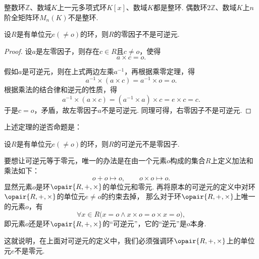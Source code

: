 \begin{example}
整数环\(\mathbb{Z}\)、数域\(K\)上一元多项式环\(K[x]\)、数域\(K\)都是整环.
偶数环\(2\mathbb{Z}\)、数域\(K\)上\(n\)阶全矩阵环\(M_n(K)\)不是整环.
\end{example}

\begin{theorem}
设\(R\)是有单位元\(e(\neq o)\)的环，则\(R\)的零因子不是可逆元.
\begin{proof}
设\(a\)是左零因子，则存在\(c \in R\)且\(c \neq o\)，使得\[
    a \times c = o.
\]

假如\(a\)是可逆元，则在上式两边左乘\(a^{-1}\)，再根据乘零定理，得\[
    a^{-1} \times (a \times c) = a^{-1} \times o = o.
\]
根据乘法的结合律和逆元的性质，得\[
    a^{-1} \times (a \times c) = (a^{-1} \times a) \times c = e \times c = c.
\]
于是\(c = o\)，矛盾，故左零因子\(a\)不是可逆元.
同理可得，右零因子不是可逆元.
\end{proof}
\end{theorem}

上述定理的逆否命题是：
\begin{corollary}
设\(R\)是有单位元\(e(\neq o)\)的环，则\(R\)的可逆元不是零因子.
\end{corollary}

\begin{example}
要想让可逆元等于零元，唯一的办法是在由一个元素\(o\)构成的集合\(R\)上定义加法和乘法如下：\[
    o + o \mapsto o,
    \qquad
    o \times o \mapsto o.
\]
显然元素\(o\)是环\(\opair{R,+,\times}\)的单位元和零元.
再将原本的可逆元的定义中对环\(\opair{R,+,\times}\)的单位元\(e \neq o\)的约束去掉，
那么对于环\(\opair{R,+,\times}\)上唯一的元素\(o\)，有\[
    \forall x \in R \bigl( x = o \land x \times o = o \times x = o \bigr),
\]
即元素\(o\)还是环\(\opair{R,+,\times}\)的“可逆元”，它的“逆元”是\(o\)本身.

这就说明，在上面对可逆元的定义中，我们必须强调环\(\opair{R,+,\times}\)上的单位元\(e\)不是零元.
\end{example}
